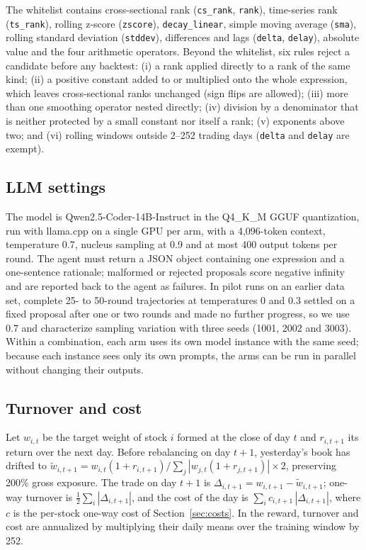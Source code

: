 \documentclass[preprint,12pt,authoryear]{elsarticle}
\begin{document}
The whitelist contains cross-sectional rank (\texttt{cs\_rank}, \texttt{rank}), time-series rank (\texttt{ts\_rank}), rolling z-score (\texttt{zscore}), \texttt{decay\_linear}, simple moving average (\texttt{sma}), rolling standard deviation (\texttt{stddev}), differences and lags (\texttt{delta}, \texttt{delay}), absolute value and the four arithmetic operators. Beyond the whitelist, six rules reject a candidate before any backtest: (i) a rank applied directly to a rank of the same kind; (ii) a positive constant added to or multiplied onto the whole expression, which leaves cross-sectional ranks unchanged (sign flips are allowed); (iii) more than one smoothing operator nested directly; (iv) division by a denominator that is neither protected by a small constant nor itself a rank; (v) exponents above two; and (vi) rolling windows outside 2--252 trading days (\texttt{delta} and \texttt{delay} are exempt).

\subsection{LLM settings}\label{app:llm}

The model is Qwen2.5-Coder-14B-Instruct in the Q4\_K\_M GGUF quantization, run with llama.cpp on a single GPU per arm, with a 4,096-token context, temperature 0.7, nucleus sampling at 0.9 and at most 400 output tokens per round. The agent must return a JSON object containing one expression and a one-sentence rationale; malformed or rejected proposals score negative infinity and are reported back to the agent as failures. In pilot runs on an earlier data set, complete 25- to 50-round trajectories at temperatures 0 and 0.3 settled on a fixed proposal after one or two rounds and made no further progress, so we use 0.7 and characterize sampling variation with three seeds (1001, 2002 and 3003). Within a combination, each arm uses its own model instance with the same seed; because each instance sees only its own prompts, the arms can be run in parallel without changing their outputs.

\subsection{Turnover and cost}\label{app:turnover}

Let $w_{i,t}$ be the target weight of stock $i$ formed at the close of day $t$ and $r_{i,t+1}$ its return over the next day. Before rebalancing on day $t+1$, yesterday's book has drifted to $\tilde w_{i,t+1} = w_{i,t}(1+r_{i,t+1}) / \sum_j |w_{j,t}(1+r_{j,t+1})| \times 2$, preserving 200\% gross exposure. The trade on day $t+1$ is $\Delta_{i,t+1} = w_{i,t+1} - \tilde w_{i,t+1}$; one-way turnover is $\tfrac{1}{2}\sum_i |\Delta_{i,t+1}|$, and the cost of the day is $\sum_i c_{i,t+1}\,|\Delta_{i,t+1}|$, where $c$ is the per-stock one-way cost of Section~\ref{sec:costs}. In the reward, turnover and cost are annualized by multiplying their daily means over the training window by 252.
\end{document}
